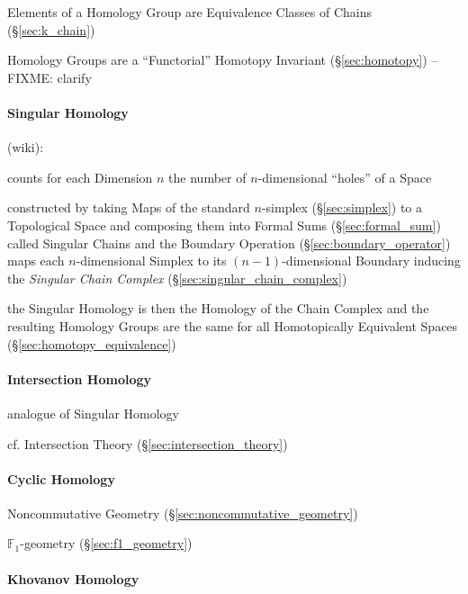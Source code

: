 Elements of a Homology Group are Equivalence
Classes of Chains (\S\ref{sec:k_chain})

Homology Groups are a ``Functorial'' Homotopy Invariant (\S\ref{sec:homotopy})
--FIXME: clarify



\paragraph{Singular Homology}\label{sec:singular_homology}\hfill

(wiki):

counts for each Dimension $n$ the number of $n$-dimensional ``holes'' of a
Space

constructed by taking Maps of the standard $n$-simplex (\S\ref{sec:simplex}) to
a Topological Space and composing them into Formal Sums
(\S\ref{sec:formal_sum}) called Singular Chains and the Boundary Operation
(\S\ref{sec:boundary_operator}) maps each $n$-dimensional Simplex to its
$(n-1)$-dimensional Boundary inducing the \emph{Singular Chain Complex}
(\S\ref{sec:singular_chain_complex})

the Singular Homology is then the Homology of the Chain Complex and the
resulting Homology Groups are the same for all Homotopically Equivalent Spaces
(\S\ref{sec:homotopy_equivalence})



\paragraph{Intersection Homology}\label{sec:intersection_homology}\hfill

analogue of Singular Homology

\fist cf. Intersection Theory (\S\ref{sec:intersection_theory})



\paragraph{Cyclic Homology}\label{sec:cyclic_homology}\hfill

Noncommutative Geometry (\S\ref{sec:noncommutative_geometry})

$\mathbb{F}_1$-geometry (\S\ref{sec:f1_geometry})



\paragraph{Khovanov Homology}\label{sec:khovanov_homology}\hfill

